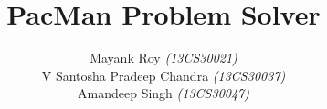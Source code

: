 \documentclass[a4paper,11pt,twoside]{report}
\begin{document}
\title{\LARGE {\bf PacMan Problem Solver}\\
 \vspace*{10mm}
}

\author{Mayank Roy \textit{(13CS30021)} \\V Santosha Pradeep Chandra \textit{(13CS30037)} \\Amandeep Singh \textit{(13CS30047)}}

\normallinespacing
\maketitle

\preface

% 

\body

% 


% 

\appendix




\end{document}
